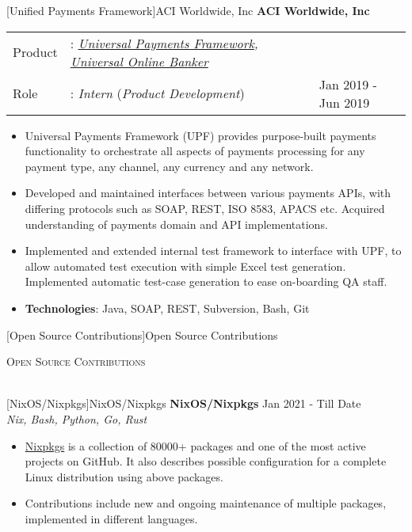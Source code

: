 \documentclass[a4paper]{article}
\newcommand{\lineunder} {
    \vspace*{-8pt} \\
    \hspace*{-18pt} \hrulefill \\
}
\newcommand{\header} [1] {
    {\hspace*{-18pt}\vspace*{6pt} \textsc{#1}}
    \vspace*{-6pt} \lineunder
}
\begin{document}
[Unified Payments Framework]{ACI Worldwide, Inc}
\textbf{ACI Worldwide, Inc} \\
\begin{tabularx}{\textwidth}{ l l>{\raggedleft\arraybackslash}X}
	Product & : \textit{\href{https://www.aciworldwide.com/solutions/payments-orchestration-platform}{Universal Payments Framework}, \href{https://dragonflyft.com/product}{Universal Online Banker}} &                     \\
	Role    & : \textit{Intern} (\textit{Product Development})                  & Jan 2019 - Jun 2019 \\
\end{tabularx}
\begin{itemize} \itemsep 1pt
	\item Universal Payments Framework (UPF) provides purpose-built payments functionality to orchestrate all aspects of payments processing for any payment type, any channel, any currency and any network.
	\item Developed and maintained interfaces between various payments APIs, with differing protocols such as SOAP, REST, ISO 8583, APACS etc. Acquired understanding of payments domain and API implementations.
	\item Implemented and extended internal test framework to interface with UPF, to allow automated test execution with simple Excel test generation. Implemented automatic test-case generation to ease on-boarding QA staff.
	\item \textbf{Technologies}: Java, SOAP, REST, Subversion, Bash, Git
\end{itemize}
\vspace{1mm}

[Open Source Contributions]{Open Source Contributions}
\header{Open Source Contributions}
\vspace{1mm}

[NixOS/Nixpkgs]{NixOS/Nixpkgs}
{\textbf{NixOS/Nixpkgs}} \hfill Jan 2021 - Till Date \\
\textit{Nix, Bash, Python, Go, Rust} \\
\begin{itemize}
	\item \href{https://github.com/NixOS/nixpkgs/}{Nixpkgs} is a collection of 80000+ packages and one of the most active projects on GitHub. It also describes possible configuration for a complete Linux distribution using above packages.
	\item Contributions include new and ongoing maintenance of multiple packages, implemented in different languages.
\end{itemize}
\end{document}
